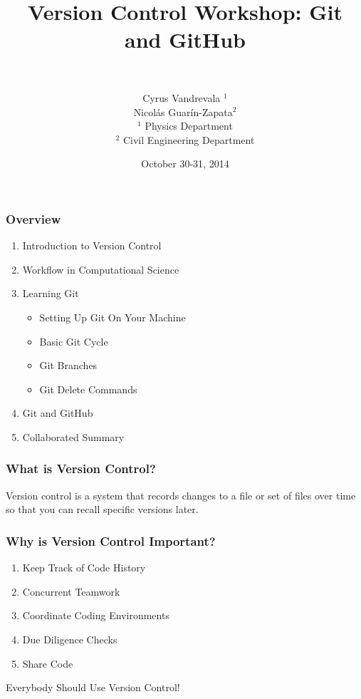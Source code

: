



\title{Version Control Workshop: Git and GitHub}
\subtitle{~}
\author[AUTHOR]{\scriptsize{Cyrus Vandrevala $^1$\\Nicol\'as Guar\'in-Zapata$^2$}\\
\tiny{$^1$ Physics Department\\ $^2$ Civil Engineering Department}}
\date{October 30-31, 2014}




\begin{frame}[plain]
  \titlepage
\end{frame}

\begin{frame}
\frametitle{\large{Overview}}
\begin{enumerate}
\item Introduction to Version Control
\item Workflow in Computational Science
\item Learning Git
\begin{itemize}
\item Setting Up Git On Your Machine
\item Basic Git Cycle
\item Git Branches
\item Git Delete Commands
\end{itemize}
\item Git and GitHub
\item Collaborated Summary
\end{enumerate}
\end{frame}


\begin{frame}
\frametitle{\large{What is Version Control?}}
Version control is a system that records changes to a file or set of files over time so that you can recall specific versions later.
\end{frame}

\begin{frame}
\frametitle{\large{Why is Version Control Important?}}
\begin{enumerate}
\item Keep Track of Code History
\pause
\item Concurrent Teamwork
\pause
\item Coordinate Coding Environments
\pause
\item Due Diligence Checks
\pause
\item Share Code
\end{enumerate}
\pause
\vspace{5mm}
Everybody Should Use Version Control!
\end{frame}

